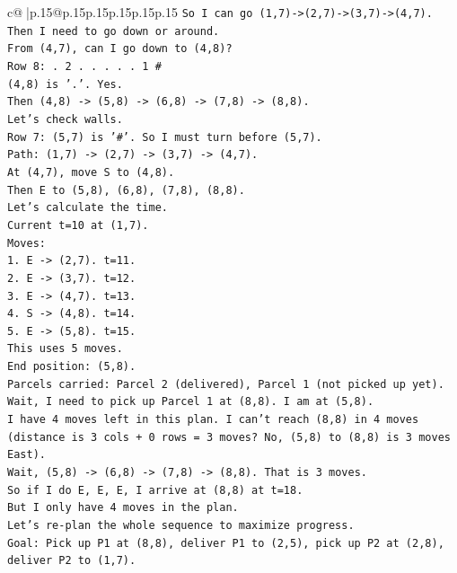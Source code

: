 \documentclass{article}
\begin{document}
{\begin{supertabular}{c@{$\;$}|p{.15\linewidth}@{}p{.15\linewidth}p{.15\linewidth}p{.15\linewidth}p{.15\linewidth}p{.15\linewidth}}
{{{\texttt{So I can go (1,7){-}>(2,7){-}>(3,7){-}>(4,7). Then I need to go down or around.} \\
\texttt{From (4,7), can I go down to (4,8)?} \\
\texttt{Row 8: . 2 . . . . . 1 \#} \\
\texttt{(4,8) is '.'. Yes.} \\
\texttt{Then (4,8) {-}> (5,8) {-}> (6,8) {-}> (7,8) {-}> (8,8).} \\
\texttt{Let's check walls.} \\
\texttt{Row 7: (5,7) is '\#'. So I must turn before (5,7).} \\
\texttt{Path: (1,7) {-}> (2,7) {-}> (3,7) {-}> (4,7).} \\
\texttt{At (4,7), move S to (4,8).} \\
\texttt{Then E to (5,8), (6,8), (7,8), (8,8).} \\
\texttt{Let's calculate the time.} \\
\texttt{Current t=10 at (1,7).} \\
\texttt{Moves:} \\
\texttt{1. E {-}> (2,7). t=11.} \\
\texttt{2. E {-}> (3,7). t=12.} \\
\texttt{3. E {-}> (4,7). t=13.} \\
\texttt{4. S {-}> (4,8). t=14.} \\
\texttt{5. E {-}> (5,8). t=15.} \\
\texttt{This uses 5 moves.} \\
\texttt{End position: (5,8).} \\
\texttt{Parcels carried: Parcel 2 (delivered), Parcel 1 (not picked up yet).} \\
\texttt{Wait, I need to pick up Parcel 1 at (8,8). I am at (5,8).} \\
\texttt{I have 4 moves left in this plan. I can't reach (8,8) in 4 moves (distance is 3 cols + 0 rows = 3 moves? No, (5,8) to (8,8) is 3 moves East).} \\
\texttt{Wait, (5,8) {-}> (6,8) {-}> (7,8) {-}> (8,8). That is 3 moves.} \\
\texttt{So if I do E, E, E, I arrive at (8,8) at t=18.} \\
\texttt{But I only have 4 moves in the plan.} \\
\texttt{Let's re{-}plan the whole sequence to maximize progress.} \\
\texttt{Goal: Pick up P1 at (8,8), deliver P1 to (2,5), pick up P2 at (2,8), deliver P2 to (1,7).} \\
}}}
\end{supertabular}}
\end{document}
